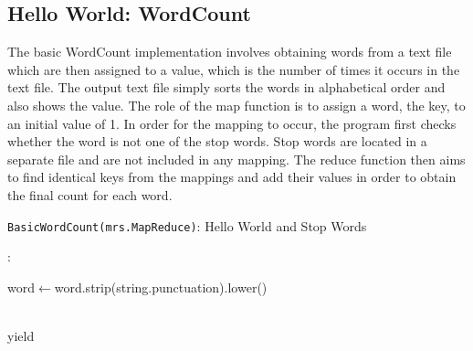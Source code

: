 \documentclass[conference]{IEEEtran}
\begin{document}
\subsection{Hello World: WordCount}
The basic WordCount implementation involves obtaining words from a text file which are then assigned to a value, which is the number of times it occurs in the text file. The output text file simply sorts the words in alphabetical order and also shows the value. The role of the map function is to assign a word, the key, to an initial value of 1. In order for the mapping to occur, the program first checks whether the word is not one of the stop words. Stop words are located in a separate file and are not included in any mapping. The reduce function then aims to find identical keys from the mappings and add their values in order to obtain the final count for each word.
\\
\begin{algorithm}[h!]

\centring



\caption{\texttt{BasicWordCount(mrs.MapReduce)}: Hello World and Stop Words}
\vspace{0.5cm}

\map:
   
        {{word$\leftarrow$word.strip(string.punctuation).lower()}}
        

\vspace{0.5cm}
\redu\\


    yield \sum





\label{ii}
\end{algorithm}
\end{document}
